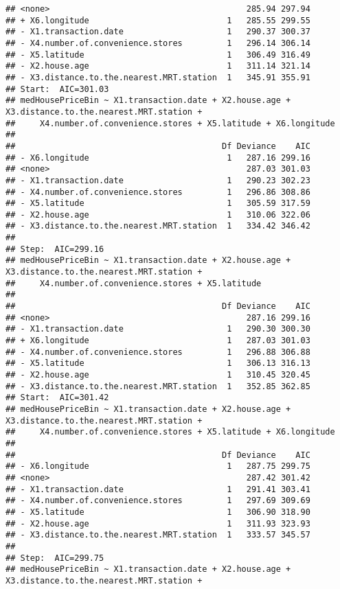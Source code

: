 \documentclass[
]{article}
\begin{document}
\begin{verbatim}
## <none>                                        285.94 297.94
## + X6.longitude                            1   285.55 299.55
## - X1.transaction.date                     1   290.37 300.37
## - X4.number.of.convenience.stores         1   296.14 306.14
## - X5.latitude                             1   306.49 316.49
## - X2.house.age                            1   311.14 321.14
## - X3.distance.to.the.nearest.MRT.station  1   345.91 355.91
## Start:  AIC=301.03
## medHousePriceBin ~ X1.transaction.date + X2.house.age + X3.distance.to.the.nearest.MRT.station + 
##     X4.number.of.convenience.stores + X5.latitude + X6.longitude
## 
##                                          Df Deviance    AIC
## - X6.longitude                            1   287.16 299.16
## <none>                                        287.03 301.03
## - X1.transaction.date                     1   290.23 302.23
## - X4.number.of.convenience.stores         1   296.86 308.86
## - X5.latitude                             1   305.59 317.59
## - X2.house.age                            1   310.06 322.06
## - X3.distance.to.the.nearest.MRT.station  1   334.42 346.42
## 
## Step:  AIC=299.16
## medHousePriceBin ~ X1.transaction.date + X2.house.age + X3.distance.to.the.nearest.MRT.station + 
##     X4.number.of.convenience.stores + X5.latitude
## 
##                                          Df Deviance    AIC
## <none>                                        287.16 299.16
## - X1.transaction.date                     1   290.30 300.30
## + X6.longitude                            1   287.03 301.03
## - X4.number.of.convenience.stores         1   296.88 306.88
## - X5.latitude                             1   306.13 316.13
## - X2.house.age                            1   310.45 320.45
## - X3.distance.to.the.nearest.MRT.station  1   352.85 362.85
## Start:  AIC=301.42
## medHousePriceBin ~ X1.transaction.date + X2.house.age + X3.distance.to.the.nearest.MRT.station + 
##     X4.number.of.convenience.stores + X5.latitude + X6.longitude
## 
##                                          Df Deviance    AIC
## - X6.longitude                            1   287.75 299.75
## <none>                                        287.42 301.42
## - X1.transaction.date                     1   291.41 303.41
## - X4.number.of.convenience.stores         1   297.69 309.69
## - X5.latitude                             1   306.90 318.90
## - X2.house.age                            1   311.93 323.93
## - X3.distance.to.the.nearest.MRT.station  1   333.57 345.57
## 
## Step:  AIC=299.75
## medHousePriceBin ~ X1.transaction.date + X2.house.age + X3.distance.to.the.nearest.MRT.station + 

\end{verbatim}
\end{document}
